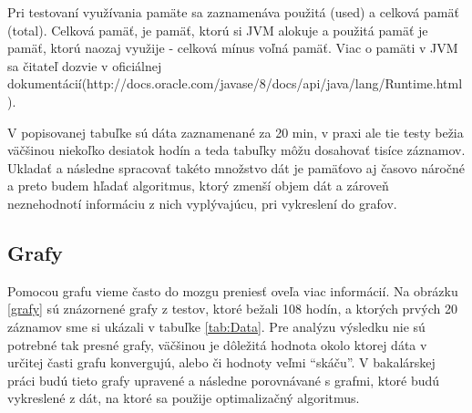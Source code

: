 Pri testovaní využívania pamäte sa zaznamenáva použitá (used) a celková pamäť (total). Celková pamäť, je pamäť, ktorú si  JVM alokuje a použitá pamäť je pamäť, ktorú naozaj využije - celková mínus voľná pamäť. Viac o pamäti v JVM sa čitateľ dozvie v oficiálnej dokumentácií(http://docs.oracle.com/javase/8/docs/api/java/lang/Runtime.html).

V popisovanej tabuľke sú dáta zaznamenané za 20 min, v praxi ale tie testy bežia väčšinou niekoľko desiatok hodín a teda tabuľky môžu dosahovať tisíce záznamov. Ukladať a následne spracovať takéto množstvo dát je pamäťovo aj časovo náročné a preto budem hľadať algoritmus, ktorý zmenší objem dát a zároveň neznehodnotí informáciu z nich vyplývajúcu, pri vykreslení do grafov.


\subsection{Grafy}

Pomocou grafu vieme často do mozgu preniesť oveľa viac informácií. 
Na obrázku  \ref{grafy} sú znázornené grafy z testov, ktoré bežali 108 hodín, a ktorých prvých 20 záznamov sme si ukázali v tabuľke  \ref{tab:Data}. Pre analýzu výsledku nie sú potrebné tak presné grafy, väčšinou je dôležitá hodnota okolo ktorej dáta v určitej časti grafu konvergujú, alebo či hodnoty veľmi ``skáču''. V bakalárskej práci budú tieto grafy upravené a následne porovnávané s grafmi, ktoré budú vykreslené z dát, na ktoré sa použije optimalizačný algoritmus.





